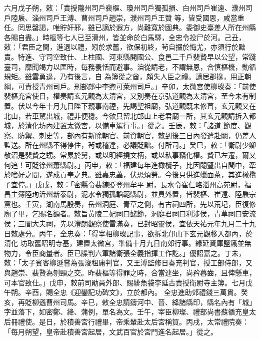 \begin{pinyinscope}
 六月戊子朔，敕：「責授隴州司戶裴樞、瓊州司戶獨孤損、白州司戶崔遠、濮州司戶陸扆、淄州司戶王溥、曹州司戶趙崇，濮州司戶王贊
 等，皆受國恩，咸當重任。罔思罄謁，唯貯奸邪，雖已謫於遐方，尚難寬於國典。委御史臺差人所在州縣各賜自盡。」時樞等七人已至滑州，皆並命於白馬驛，全忠令投尸於河。己丑，敕：「君臣之間，進退以禮，矧於求舊，欲保初終，茍自掇於悔尤，亦須行於黜責。特進、守司空致仕、上柱國、河東縣開國公、食邑二千戶裴贄早以公望，常踐臺司，靡聞竭力以匡時，每務養恬而避事。洎從請老，不謂無恩，合慎樞機，動循規矩。雖雲勇退，乃有後言，自
 為簿從之酋，頗失人臣之禮。謫居郡掾，用正朝綱，可責授青州司戶。刑部郎中李煦可萊州司戶。」辛卯，太微宮使柳璨奏：「前使裴樞充宮使日，權奏請玄元觀為太清宮，又別奏在京弘道觀為太清宮，至今未有制置。伏以今年十月九日陛下親事南禋，先謁聖祖廟，弘道觀既未修葺，玄元觀又在北山，若車駕出城，禮非便穩。今欲只留北邙山上老君廟一所，其玄元觀請拆入都城，於清化坊內建置太微宮，以備車駕行事。」從之。壬辰，敕：「諸道
 節度、觀察、防禦、刺史等，部內有新除朝官、前資朝官，敕到後三日內發遣赴闕，仍差人監送。所在州縣不得停住，茍或稽違，必議貶黜。付所司。」癸巳，敕：「衛尉少卿敬沼是裴贄之甥。常累於舅，或以明經撓文柄，或以私事竊化權。贄已左遷，爾又何追！可貶徐州蕭縣尉。」丙申，敕：「福建每年進橄欖子，比因閹豎出自閩中，牽於嗜好之間，遂成貢奉之典。雖嘉忠藎，伏恐煩勞。今後只供進蠟面茶，其進橄欖子宜停。」戊戌，敕：「密縣令裴練貶登州牟平
 尉，長水令崔仁略淄州高苑尉，福昌主簿陸珣沂州新泰尉，泥水令獨孤韜範縣尉，並員外置，皆裴樞、崔遠、陸扆宗黨也。壬寅，湖南馬殷奏，岳州洞庭、青草之側，有古祠四所，先以荒圮，臣復修廟了畢，乞賜名額者。敕旨黃陵二妃祠曰懿節，洞庭君祠曰利涉侯，青草祠曰安流侯；三閭大夫祠，先以澧朗觀察使雷滿奏，已封昭靈侯，宜依天祐元年九月二十九日敕處分。丙午，全忠奏：「得宰相柳璨記事，欲拆北邙山下玄元觀移入都內，於清化
 坊取舊昭明寺基，建置太微宮，準備十月九日南郊行事。緣延資庫鹽鐵並無物力，令臣商量者。臣已牒判六軍諸衛張全義指揮工作訖。」優詔嘉之。丁未，敕：「太子賓客柳遜嘗為張浚租庸判官，又王溥監修日奏充判官，授工部侍郎，又與趙崇、裴贄為刎頸之交。昨裴樞等得罪之時，合當連坐，尚矜暮齒，且俾懸車，可本官致仕。」戊申，敕前司勛員外郎、賜緋魚袋李延古責授衛尉寺主簿。七月戊午朔。辛酉，賜全忠《迎鑾記功碑文》，立於都內。
 全忠進助郊禮錢三萬貫。癸亥，再貶柳遜曹州司馬。辛巳，敕全忠請鑄河中、晉、絳諸縣印，縣名內有「城」字並落下，如密鄭、絳、蒲例，單名為文。壬午，宰臣柳璨、禮部尚書蘇循充皇太后冊禮使。是日，於積善宮行禮畢，帝乘輦赴太后宮稱賀。丙戌，太常禮院奏：「每月朔望，皇帝赴積善宮起居，文武百官於宮門進名起居。」從之。




\end{pinyinscope}
